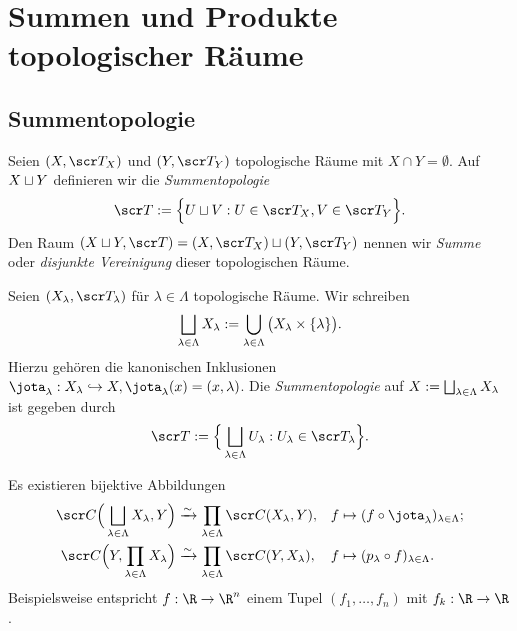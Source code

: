 \section{Summen und Produkte topologischer Räume} %


\subsection{Summentopologie}

\begin{df}
	Seien $(X, \scr T_X)$ und $(Y, \scr T_Y)$ topologische Räume mit $X \cap Y = \emptyset$.
	Auf $X \sqcup Y$ definieren wir die \emph{Summentopologie}
	\[
		\scr T
		:= \Big\{ U \dunion V : U \in \scr T_X, V \in \scr T_Y \Big\}.
	\]
	Den Raum $(X \dunion Y, \scr T) = (X, \scr T_X) \dunion (Y, \scr T_Y)$ nennen wir \emph{Summe} oder \emph{disjunkte Vereinigung} dieser topologischen Räume.
\end{df}

\begin{df}
	Seien $(X_\lambda, \scr T_\lambda)$ für $\lambda \in \Lambda$ topologische Räume.
	Wir schreiben
	\[
		\bigsqcup_{\lambda \in \Lambda} X_\lambda
		:= \bigcup_{\lambda \in \Lambda} \big( X_\lambda \times \{\lambda\} \big).
	\]
	Hierzu gehören die kanonischen Inklusionen $\jota_\lambda: X_\lambda \injto X, \jota_\lambda (x) = (x, \lambda)$.
	Die \emph{Summentopologie} auf $X := \bigsqcup_{\lambda \in \Lambda} X_\lambda$ ist gegeben durch
	\[
		\scr T
		:= \Big\{ \bigdunion_{\lambda \in \Lambda} U_\lambda : U_\lambda \in \scr T_\lambda \Big\}.
	\]
\end{df}

\begin{st}
	Es existieren bijektive Abbildungen
	\begin{align*}
		\scr C\Big(\bigdunion_{\lambda\in\Lambda} X_\lambda, Y\Big) &\bijto \prod_{\lambda \in \Lambda} \scr C(X_\lambda, Y), &
		f & \mapsto (f \circ \jota_\lambda)_{\lambda\in\Lambda}; \\
		\scr C\Big(Y, \prod_{\lambda\in\Lambda}X_\lambda\Big) &\bijto \prod_{\lambda\in\Lambda} \scr C(Y, X_\lambda), &
		f & \mapsto (p_\lambda \circ f)_{\lambda\in\Lambda}.
	\end{align*}
	Beispielsweise entspricht $f : \R \to \R^n$ einem Tupel $(f_1, \dotsc, f_n)$ mit $f_k : \R \to \R$.
\end{st}

